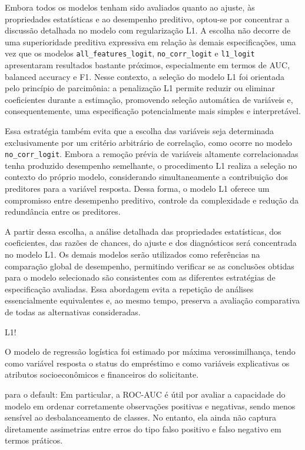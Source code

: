 \documentclass[
  brazilian,
  12pt,
  letterpaper,
  DIV=11,
  numbers=noendperiod]{scrartcl}
\begin{document}
Embora todos os modelos tenham sido avaliados quanto ao ajuste, às
propriedades estatísticas e ao desempenho preditivo, optou-se por
concentrar a discussão detalhada no modelo com regularização L1. A
escolha não decorre de uma superioridade preditiva expressiva em relação
às demais especificações, uma vez que os modelos
\texttt{all\_features\_logit}, \texttt{no\_corr\_logit} e
\texttt{l1\_logit} apresentaram resultados bastante próximos,
especialmente em termos de AUC, balanced accuracy e F1. Nesse contexto,
a seleção do modelo L1 foi orientada pelo princípio de parcimônia: a
penalização L1 permite reduzir ou eliminar coeficientes durante a
estimação, promovendo seleção automática de variáveis e,
consequentemente, uma especificação potencialmente mais simples e
interpretável.

Essa estratégia também evita que a escolha das variáveis seja
determinada exclusivamente por um critério arbitrário de correlação,
como ocorre no modelo \texttt{no\_corr\_logit}. Embora a remoção prévia
de variáveis altamente correlacionadas tenha produzido desempenho
semelhante, o procedimento L1 realiza a seleção no contexto do próprio
modelo, considerando simultaneamente a contribuição dos preditores para
a variável resposta. Dessa forma, o modelo L1 oferece um compromisso
entre desempenho preditivo, controle da complexidade e redução da
redundância entre os preditores.

A partir dessa escolha, a análise detalhada das propriedades
estatísticas, dos coeficientes, das razões de chances, do ajuste e dos
diagnósticos será concentrada no modelo L1. Os demais modelos serão
utilizados como referências na comparação global de desempenho,
permitindo verificar se as conclusões obtidas para o modelo selecionado
são consistentes com as diferentes estratégias de especificação
avaliadas. Essa abordagem evita a repetição de análises essencialmente
equivalentes e, ao mesmo tempo, preserva a avaliação comparativa de
todas as alternativas consideradas.

L1!

O modelo de regressão logística foi estimado por máxima verossimilhança,
tendo como variável resposta o status do empréstimo e como variáveis
explicativas os atributos socioeconômicos e financeiros do solicitante.

para o default: Em particular, a ROC-AUC é útil por avaliar a capacidade
do modelo em ordenar corretamente observações positivas e negativas,
sendo menos sensível ao desbalanceamento de classes. No entanto, ela
ainda não captura diretamente assimetrias entre erros do tipo falso
positivo e falso negativo em termos práticos.
\end{document}
